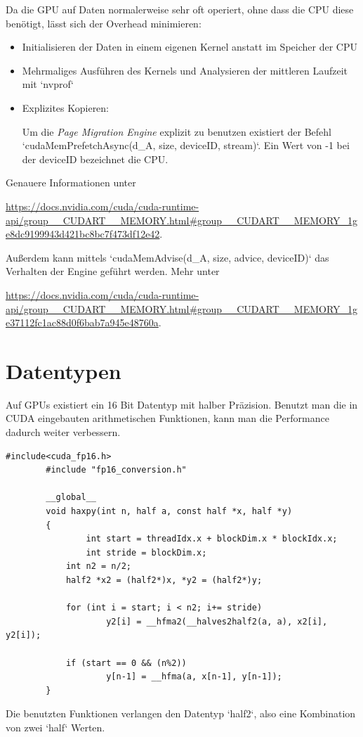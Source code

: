 		Da die GPU auf Daten normalerweise sehr oft operiert, ohne dass die CPU diese benötigt, lässt sich der Overhead minimieren:
		\begin{itemize}
		    \item Initialisieren der Daten in einem eigenen \Gls{Kernel} anstatt im Speicher der CPU
		    \item Mehrmaliges Ausführen des \Gls{Kernel}s und Analysieren der mittleren Laufzeit mit \li`nvprof`
	    	    \item Explizites Kopieren: 
	    	    
	    	    Um die \textit{Page Migration Engine} explizit zu benutzen existiert der Befehl \li`cudaMemPrefetchAsync(d_A, size, deviceID, stream)`. Ein Wert von -1 bei der deviceID bezeichnet die CPU.
		\end{itemize}
		Genauere Informationen unter 
		
		\url{https://docs.nvidia.com/cuda/cuda-runtime-api/group__CUDART__MEMORY.html#group__CUDART__MEMORY_1ge8dc9199943d421bc8bc7f473df12e42}.
		
		Außerdem kann mittels \li`cudaMemAdvise(d_A, size, advice, deviceID)` das Verhalten der Engine geführt werden. Mehr unter 
		
		\url{https://docs.nvidia.com/cuda/cuda-runtime-api/group__CUDART__MEMORY.html#group__CUDART__MEMORY_1ge37112fc1ac88d0f6bab7a945e48760a}.

		\section{Datentypen}
		Auf GPUs existiert ein 16 Bit Datentyp mit halber Präzision. Benutzt man die in CUDA eingebauten arithmetischen Funktionen, kann man die Performance dadurch weiter verbessern.			
		\begin{lstlisting}[caption=Half Precision]
		#include<cuda_fp16.h>
		#include "fp16_conversion.h"
		
		__global__
		void haxpy(int n, half a, const half *x, half *y)
		{
    		    int start = threadIdx.x + blockDim.x * blockIdx.x;
    		    int stride = blockDim.x;
			int n2 = n/2;
			half2 *x2 = (half2*)x, *y2 = (half2*)y;

			for (int i = start; i < n2; i+= stride) 
					y2[i] = __hfma2(__halves2half2(a, a), x2[i], y2[i]);

			if (start == 0 && (n%2))
					y[n-1] = __hfma(a, x[n-1], y[n-1]);
		}
		\end{lstlisting}
		
	    Die benutzten Funktionen verlangen den Datentyp \li`half2`, also eine Kombination von zwei \li`half` Werten.
	    
